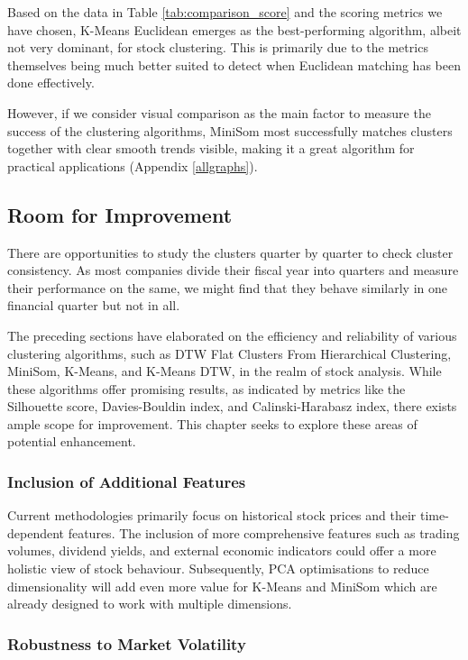 \documentclass[11pt]{article}
\begin{document}
Based on the data in Table \ref{tab:comparison_score} and the scoring metrics we have chosen, K-Means Euclidean emerges as the best-performing algorithm, albeit not very dominant, for stock clustering. This is primarily due to the metrics themselves being much better suited to detect when Euclidean matching has been done effectively.

However, if we consider visual comparison as the main factor to measure the success of the clustering algorithms, MiniSom most successfully matches clusters together with clear smooth trends visible, making it a great algorithm for practical applications (Appendix \ref{allgraphs}). 

\subsection{Room for Improvement}

There are opportunities to study the clusters quarter by quarter to check cluster consistency. As most companies divide their fiscal year into quarters and measure their performance on the same, we might find that they behave similarly in one financial quarter but not in all. 

The preceding sections have elaborated on the efficiency and reliability of various clustering algorithms, such as DTW Flat Clusters From Hierarchical Clustering, MiniSom, K-Means, and K-Means DTW, in the realm of stock analysis. While these algorithms offer promising results, as indicated by metrics like the Silhouette score, Davies-Bouldin index, and Calinski-Harabasz index, there exists ample scope for improvement. This chapter seeks to explore these areas of potential enhancement.

\subsubsection{Inclusion of Additional Features}

Current methodologies primarily focus on historical stock prices and their time-dependent features. The inclusion of more comprehensive features such as trading volumes, dividend yields, and external economic indicators could offer a more holistic view of stock behaviour. Subsequently, PCA optimisations to reduce dimensionality will add even more value for K-Means and MiniSom which are already designed to work with multiple dimensions.

\subsubsection{Robustness to Market Volatility}
\end{document}
